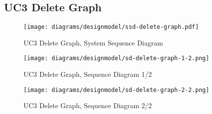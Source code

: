 \subsection{UC3 Delete Graph}
\begin{figure}[H]
    \centering
    \texttt{[image: diagrams/designmodel/ssd-delete-graph.pdf]}
    \caption{UC3 Delete Graph, System Sequence Diagram}
    \label{fig:delete-graph-ssd}
\end{figure}
\begin{figure}[p]%
  \begin{leftfullpage}
    \texttt{[image: diagrams/designmodel/sd-delete-graph-1-2.png]}
    \caption{UC3 Delete Graph, Sequence Diagram 1/2}
    \label{fig:delete-graph-sd-1}
  \end{leftfullpage}
\end{figure}
\begin{figure}[p]%
  \begin{fullpage}
    \texttt{[image: diagrams/designmodel/sd-delete-graph-2-2.png]}
    \caption{UC3 Delete Graph, Sequence Diagram 2/2}
    \label{fig:delete-graph-sd-2}
  \end{fullpage}
\end{figure}
% 
